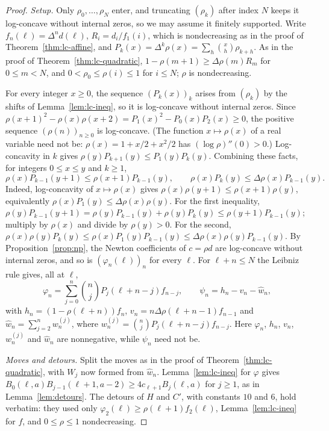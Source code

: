 \documentclass[twoside,10pt]{article}
\numberwithin{equation}{section}
\theoremstyle{slbody}
\theoremstyle{definition}
\theoremstyle{remark}
\begin{document}
\begin{proof}
\emph{Setup.} Only $\rho_0,\ldots,\rho_N$ enter, and truncating $(\rho_k)$ after index $N$ keeps it log-concave without internal zeros, so we may assume it finitely supported. Write $f_n(\ell)=\Delta^nd(\ell)$, $R_i=d_i/f_1(i)$, which is nondecreasing as in the proof of Theorem~\ref{thm:lc-affine}, and $P_k(x)=\Delta^k\rho(x)=\sum_h\binom xh\rho_{k+h}$. As in the proof of Theorem~\ref{thm:lc-quadratic}, $1-\rho(m+1)\geq\Delta\rho(m)R_m$ for $0\leq m<N$, and $0<\rho_0\leq\rho(i)\leq1$ for $i\leq N$; $\rho$ is nondecreasing.

For every integer $x\geq0$, the sequence $(P_k(x))_k$ arises from $(\rho_k)$ by the shifts of Lemma~\ref{lem:lc-ineq}, so it is log-concave without internal zeros. Since $\rho(x+1)^2-\rho(x)\rho(x+2)=P_1(x)^2-P_0(x)P_2(x)\geq0$, the positive sequence $(\rho(n))_{n\geq0}$ is log-concave. (The function $x\mapsto\rho(x)$ of a real variable need not be: $\rho(x)=1+x/2+x^2/2$ has $(\log\rho)''(0)>0$.) Log-concavity in $k$ gives $\rho(y)P_{k+1}(y)\leq P_1(y)P_k(y)$. Combining these facts, for integers $0\leq x\leq y$ and $k\geq1$,
\begin{equation}\label{eq:G-ratio}
\rho(x)P_{k-1}(y+1)\leq\rho(x+1)P_{k-1}(y),\qquad\rho(x)P_k(y)\leq\Delta\rho(x)P_{k-1}(y).
\end{equation}
Indeed, log-concavity of $x\mapsto\rho(x)$ gives $\rho(x)\rho(y+1)\leq\rho(x+1)\rho(y)$, equivalently $\rho(x)P_1(y)\leq\Delta\rho(x)\rho(y)$. For the first inequality, $\rho(y)P_{k-1}(y+1)=\rho(y)P_{k-1}(y)+\rho(y)P_k(y)\leq\rho(y+1)P_{k-1}(y)$; multiply by $\rho(x)$ and divide by $\rho(y)>0$. For the second, $\rho(x)\rho(y)P_k(y)\leq\rho(x)P_1(y)P_{k-1}(y)\leq\Delta\rho(x)\rho(y)P_{k-1}(y)$. By Proposition~\ref{prop:np}, the Newton coefficients of $c=\rho d$ are log-concave without internal zeros, and so is $(\varphi_n(\ell))_n$ for every $\ell$. For $\ell+n\leq N$ the Leibniz rule gives, all at $\ell$,
\[
\varphi_n=\sum_{j=0}^n\binom njP_j(\ell+n-j)f_{n-j},\qquad\psi_n=h_n-v_n-\widehat w_n,
\]
with $h_n=(1-\rho(\ell+n))f_n$, $v_n=n\Delta\rho(\ell+n-1)f_{n-1}$ and $\widehat w_n=\sum_{j=2}^nw^{(j)}_n$, where $w^{(j)}_n=\binom njP_j(\ell+n-j)f_{n-j}$. Here $\varphi_n$, $h_n$, $v_n$, $w^{(j)}_n$ and $\widehat w_n$ are nonnegative, while $\psi_n$ need not be.

\emph{Moves and detours.} Split the moves as in the proof of Theorem~\ref{thm:lc-quadratic}, with $W_j$ now formed from $\widehat w_n$. Lemma~\ref{lem:lc-ineq} for $\varphi$ gives $B_0(\ell,a)B_{j-1}(\ell+1,a-2)\geq4c_{\ell+1}B_j(\ell,a)$ for $j\geq1$, as in Lemma~\ref{lem:detours}. The detours of $H$ and $C'$, with constants $10$ and $6$, hold verbatim: they used only $\varphi_2(\ell)\geq\rho(\ell+1)f_2(\ell)$, Lemma~\ref{lem:lc-ineq} for $f$, and $0\leq\rho\leq1$ nondecreasing.


\end{proof}
\end{document}
